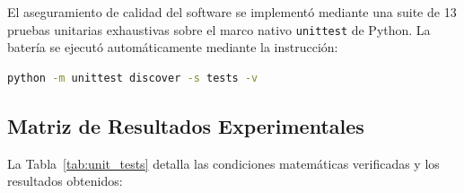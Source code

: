 \documentclass[11pt,a4paper]{article}
\begin{document}
El aseguramiento de calidad del software se implementó mediante una suite de 13 pruebas unitarias exhaustivas sobre el marco nativo \texttt{unittest} de Python. La batería se ejecutó automáticamente mediante la instrucción:

\begin{lstlisting}[language=bash]
python -m unittest discover -s tests -v
\end{lstlisting}

\subsection{Matriz de Resultados Experimentales}

La Tabla~\ref{tab:unit_tests} detalla las condiciones matemáticas verificadas y los resultados obtenidos:
\end{document}
